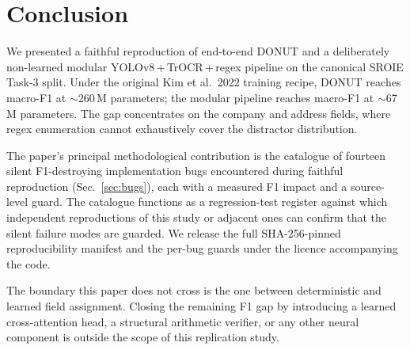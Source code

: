 \section{Conclusion}
\label{sec:conclusion}

We presented a faithful reproduction of end-to-end DONUT and a
deliberately non-learned modular YOLOv8\,+\,TrOCR\,+\,regex pipeline
on the canonical SROIE Task-3 split.  Under the original Kim et al.\
2022 training recipe, DONUT reaches  macro-F1 at
$\sim$260\,M parameters; the modular pipeline reaches
 macro-F1 at $\sim$67\,M parameters.  The gap
concentrates on the \textsf{company} and \textsf{address} fields,
where regex enumeration cannot exhaustively cover the distractor
distribution.

The paper's principal methodological contribution is the catalogue of
fourteen silent F1-destroying implementation bugs encountered during
faithful reproduction (Sec.~\ref{sec:bugs}), each with a measured
F1 impact and a source-level guard.  The catalogue functions as a
regression-test register against which independent reproductions of
this study or adjacent ones can confirm that the silent failure modes
are guarded.  We release the full SHA-256-pinned reproducibility
manifest and the per-bug guards under the licence accompanying the
code.

The boundary this paper does not cross is the one between
deterministic and learned field assignment.  Closing the remaining
F1 gap by introducing a learned cross-attention head, a structural
arithmetic verifier, or any other neural component is outside the
scope of this replication study.
